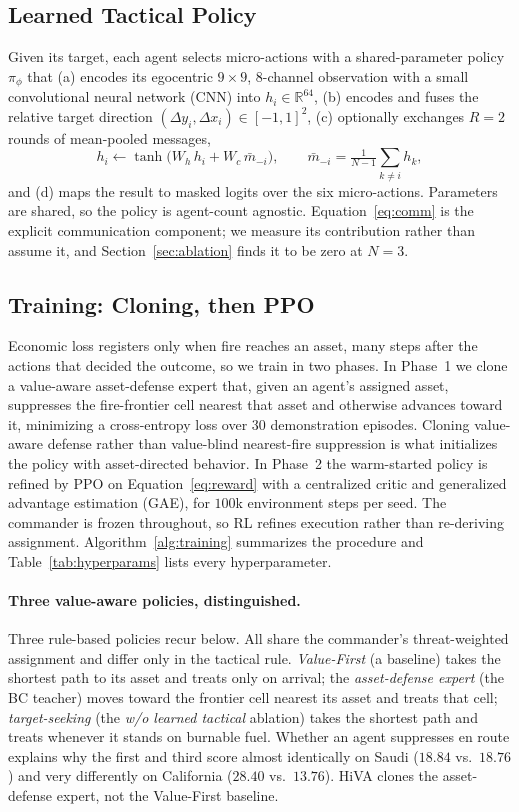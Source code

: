 \documentclass[letterpaper]{article}
\begin{document}
\subsection{Learned Tactical Policy}
\label{sec:tactical}
Given its target, each agent selects micro-actions with a shared-parameter policy $\pi_\phi$ that (a) encodes its egocentric $9{\times}9$, 8-channel observation with a small convolutional neural network (CNN) into $h_i \in \mathbb{R}^{64}$, (b) encodes and fuses the relative target direction $(\Delta y_i, \Delta x_i) \in [-1,1]^2$, (c) optionally exchanges $R = 2$ rounds of mean-pooled messages,
\begin{equation}
\label{eq:comm}
h_i \leftarrow \tanh\!\bigl(W_h\, h_i + W_c\, \bar{m}_{-i}\bigr), \qquad \bar{m}_{-i} = \tfrac{1}{N-1}\!\sum_{k \neq i} h_k,
\end{equation}
and (d) maps the result to masked logits over the six micro-actions. Parameters are shared, so the policy is agent-count agnostic. Equation~\ref{eq:comm} is the explicit communication component; we measure its contribution rather than assume it, and Section~\ref{sec:ablation} finds it to be zero at $N=3$.

\subsection{Training: Cloning, then PPO}
\label{sec:training}
Economic loss registers only when fire reaches an asset, many steps after the actions that decided the outcome, so we train in two phases. In Phase~1 we clone a value-aware asset-defense expert that, given an agent's assigned asset, suppresses the fire-frontier cell nearest that asset and otherwise advances toward it, minimizing a cross-entropy loss over $30$ demonstration episodes. Cloning value-aware defense rather than value-blind nearest-fire suppression is what initializes the policy with asset-directed behavior. In Phase~2 the warm-started policy is refined by PPO on Equation~\ref{eq:reward} with a centralized critic and generalized advantage estimation (GAE), for $100$k environment steps per seed. The commander is frozen throughout, so RL refines execution rather than re-deriving assignment. Algorithm~\ref{alg:training} summarizes the procedure and Table~\ref{tab:hyperparams} lists every hyperparameter.

\paragraph{Three value-aware policies, distinguished.} Three rule-based policies recur below. All share the commander's threat-weighted assignment and differ only in the tactical rule. \emph{Value-First} (a baseline) takes the shortest path to its asset and treats only on arrival; the \emph{asset-defense expert} (the BC teacher) moves toward the frontier cell nearest its asset and treats that cell; \emph{target-seeking} (the \emph{w/o learned tactical} ablation) takes the shortest path and treats whenever it stands on burnable fuel. Whether an agent suppresses en route explains why the first and third score almost identically on Saudi ($18.84$ vs.\ $18.76$) and very differently on California ($28.40$ vs.\ $13.76$). HiVA clones the asset-defense expert, not the Value-First baseline.
\end{document}
